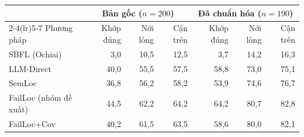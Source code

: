 \begin{tabular}{lrrrrrr}
\toprule
 & \multicolumn{3}{c}{Bản gốc ($n=200$)} & \multicolumn{3}{c}{Đã chuẩn hóa ($n=190$)} \\
\cmidrule(lr){2-4}\cmidrule(lr){5-7}
Phương pháp & Khớp đúng & Nới lỏng & Cận trên & Khớp đúng & Nới lỏng & Cận trên \\
\midrule
SBFL (Ochiai) & 3,0 & 10,5 & 12,5 & 3,7 & 14,2 & 16,3 \\
LLM-Direct & 40,0 & 55,5 & 57,5 & 58,8 & 73,0 & 75,1 \\
SemLoc & 36,8 & 56,2 & 58,2 & 53,9 & 74,6 & 76,7 \\
FailLoc (nhóm đề xuất) & 44,5 & 62,2 & 64,2 & 64,2 & 80,7 & 82,8 \\
FailLoc+Cov & 40,2 & 61,5 & 63,5 & 58,6 & 80,0 & 82,1 \\
\bottomrule
\end{tabular}
